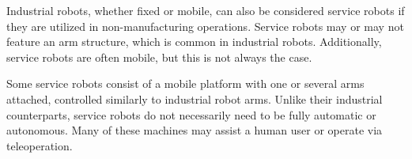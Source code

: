 Industrial robots, whether fixed or mobile, can also be considered service robots if they are utilized in non-manufacturing operations. 
Service robots may or may not feature an arm structure, which is common in industrial robots. 
Additionally, service robots are often mobile, but this is not always the case.

Some service robots consist of a mobile platform with one or several arms attached, controlled similarly to industrial robot arms. 
Unlike their industrial counterparts, service robots do not necessarily need to be fully automatic or autonomous. 
Many of these machines may assist a human user or operate via teleoperation.
